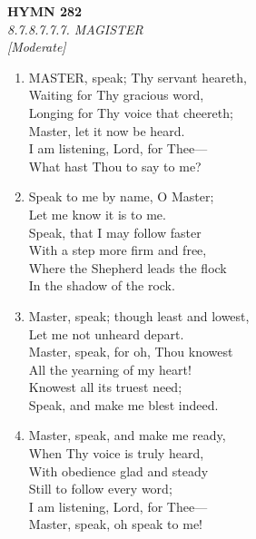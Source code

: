 \newpage
\begin{center}
    {\Large \textbf{HYMN 282}}
    \\
    \textit{8.7.8.7.7.7. MAGISTER}
    \\
    \textit{\small [Moderate]}
\end{center}
\vspace{1em}

\begin{enumerate}
    \item MASTER, speak; Thy servant heareth, \\
        Waiting for Thy gracious word, \\
        Longing for Thy voice that cheereth; \\
        Master, let it now be heard. \\
        I am listening, Lord, for Thee--- \\
        What hast Thou to say to me?

    \item Speak to me by name, O Master; \\
        Let me know it is to me. \\
        Speak, that I may follow faster \\
        With a step more firm and free, \\
        Where the Shepherd leads the flock \\
        In the shadow of the rock.

    \item Master, speak; though least and lowest, \\
        Let me not unheard depart. \\
        Master, speak, for oh, Thou knowest \\
        All the yearning of my heart! \\
        Knowest all its truest need; \\
        Speak, and make me blest indeed.

    \item Master, speak, and make me ready, \\
        When Thy voice is truly heard, \\
        With obedience glad and steady \\
        Still to follow every word; \\
        I am listening, Lord, for Thee--- \\
        Master, speak, oh speak to me!

\end{enumerate}

